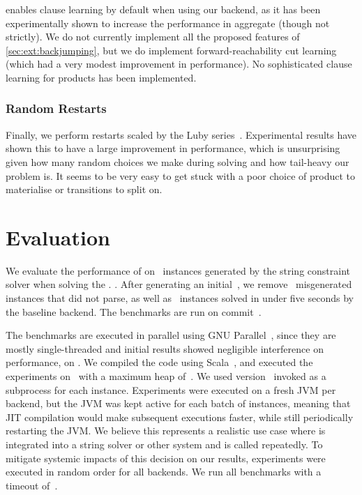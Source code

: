 \documentclass[acmsmall,review,anonymous,screen]{acmart}\settopmatter{printfolios=true,printccs=false,printacmref=true}
\theoremstyle{definition}
\begin{document}
\Catra{} enables clause learning by default when using our backend, as it has
been experimentally shown to increase the performance in aggregate (though not
strictly). We do not currently implement all the proposed features of
\cref{sec:ext:backjumping}, but we do implement forward-reachability cut
learning (which had a very modest improvement in performance). No sophisticated
clause learning for products has been implemented.

\subsubsection{Random Restarts}

Finally, we perform restarts scaled by the Luby series~\cite{luby}. Experimental
results have shown this to have a large improvement in performance, which is
unsurprising given how many random choices we make during solving and how
tail-heavy our problem is. It seems to be very easy to get stuck with a poor
choice of product to materialise or transitions to split on.

\section{Evaluation}\label{sec:experiments}

We evaluate the performance of \Catra{} on~\NrBenchmarks{} instances generated
by the \Ostrich{} string constraint solver when solving the . . After
generating an initial~\InitialNrBenchmarks{}, we remove~\NrBroken{} misgenerated
instances that did not parse, as well as~\NrTrivial{} instances solved in under
five seconds by the baseline backend. The benchmarks are run on
commit~\texttt{\commit}.

The benchmarks are executed in parallel using GNU Parallel~\cite{parallel},
since they are mostly single-threaded and initial results showed negligible
interference on performance, on \BenchmarkRig{}. We compiled the code using
Scala~\ScalaVersion{}, and executed the experiments on~\JvmVersion{} with a
maximum heap of~\MaxHeapSize{}. We used \Nuxmv{} version~\NuxmvVersion{} invoked
as a subprocess for each instance. Experiments were executed on a fresh JVM per
backend, but the JVM was kept active for each batch of \BatchSize{} instances,
meaning that JIT compilation would make subsequent executions faster, while
still periodically restarting the JVM. We believe this represents a realistic
use case where \Calculus{} is integrated into a string solver or other system
and is called repeatedly. To mitigate systemic impacts of this decision on our
results, experiments were executed in random order for all backends. We run all
benchmarks with a timeout of~\RuntimeTimeout{}.
\end{document}
